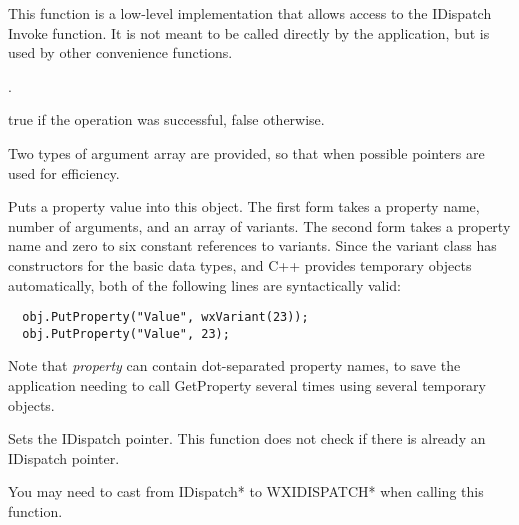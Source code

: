 This function is a low-level implementation that allows access to the IDispatch Invoke function.
It is not meant to be called directly by the application, but is used by other convenience functions.




.





true if the operation was successful, false otherwise.


Two types of argument array are provided, so that when possible pointers are used for efficiency.

\label{wxautomationobjectputproperty}



Puts a property value into this object. The first form takes a property name, number of
arguments, and an array of variants. The second form takes a property name and zero to six
constant references to variants. Since the variant class has constructors for the basic
data types, and C++ provides temporary objects automatically, both of the following lines
are syntactically valid:

{\small
\begin{verbatim}
  obj.PutProperty("Value", wxVariant(23));
  obj.PutProperty("Value", 23);
\end{verbatim}
}

Note that {\it property} can contain dot-separated property names, to save the application
needing to call GetProperty several times using several temporary objects.

\label{wxautomationobjectsetdispatchptr}


Sets the IDispatch pointer. This function does not check if there is already an IDispatch pointer.

You may need to cast from IDispatch* to WXIDISPATCH* when calling this function.

